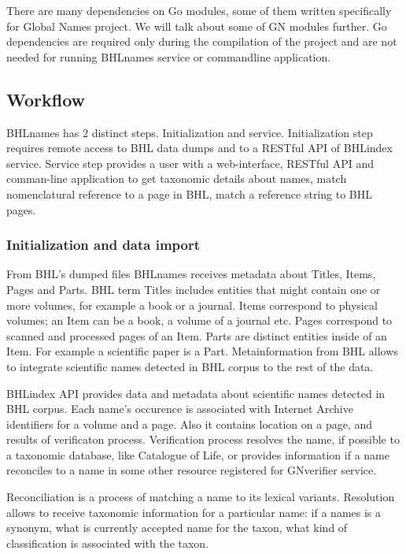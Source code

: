 \documentclass[
]{article}
\begin{document}
There are many dependencies on Go modules, some of them written
specifically for Global Names project. We will talk about some of GN
modules further. Go dependencies are required only during the
compilation of the project and are not needed for running BHLnames
service or commandline application.

\hypertarget{workflow}{%
\subsection{Workflow}\label{workflow}}

BHLnames has 2 distinct steps. Initialization and service.
Initialization step requires remote access to BHL data dumps and to a
RESTful API of BHLindex service. Service step provides a user with a
web-interface, RESTful API and comman-line application to get taxonomic
details about names, match nomenclatural reference to a page in BHL,
match a reference string to BHL pages.

\hypertarget{initialization-and-data-import}{%
\subsubsection{Initialization and data
import}\label{initialization-and-data-import}}

From BHL's dumped files BHLnames receives metadata about Titles, Items,
Pages and Parts. BHL term Titles includes entities that might contain
one or more volumes, for example a book or a journal. Items correspond
to physical volumes; an Item can be a book, a volume of a journal etc.
Pages correspond to scanned and processed pages of an Item. Parts are
distinct entities inside of an Item. For example a scientific paper is a
Part. Metainformation from BHL allows to integrate scientific names
detected in BHL corpus to the rest of the data.

BHLindex API provides data and metadata about scientific names detected
in BHL corpus. Each name's occurence is associated with Internet Archive
identifiers for a volume and a page. Also it contains location on a
page, and results of verificaton process. Verification process resolves
the name, if possible to a taxonomic database, like Catalogue of Life,
or provides information if a name reconciles to a name in some other
resource registered for GNverifier service.

Reconciliation is a process of matching a name to its lexical variants.
Resolution allows to receive taxonomic information for a particular
name: if a names is a synonym, what is currently accepted name for the
taxon, what kind of classification is associated with the taxon.
\end{document}
